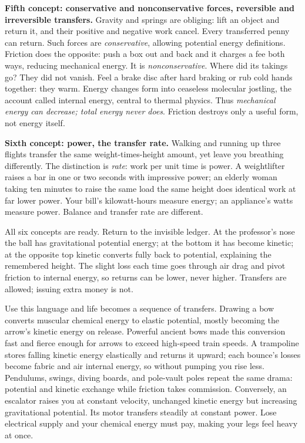 \begin{mainline}
\textbf{Fifth concept: conservative and nonconservative forces, reversible and irreversible transfers.} Gravity and springs are obliging: lift an object and return it, and their positive and negative work cancel. Every transferred penny can return. Such forces are \emph{conservative}, allowing potential energy definitions. Friction does the opposite: push a box out and back and it charges a fee both ways, reducing mechanical energy. It is \emph{nonconservative}. Where did its takings go? They did not vanish. Feel a brake disc after hard braking or rub cold hands together: they warm. Energy changes form into ceaseless molecular jostling, the account called internal energy, central to thermal physics. Thus \emph{mechanical energy can decrease; total energy never does}. Friction destroys only a useful form, not energy itself.

\textbf{Sixth concept: power, the transfer rate.} Walking and running up three flights transfer the same weight-times-height amount, yet leave you breathing differently. The distinction is \emph{rate}: work per unit time is power. A weightlifter raises a bar in one or two seconds with impressive power; an elderly woman taking ten minutes to raise the same load the same height does identical work at far lower power. Your bill's kilowatt-hours measure energy; an appliance's watts measure power. Balance and transfer rate are different.
\end{mainline}

All six concepts are ready. Return to the invisible ledger. At the professor's nose the ball has gravitational potential energy; at the bottom it has become kinetic; at the opposite top kinetic converts fully back to potential, explaining the remembered height. The slight loss each time goes through air drag and pivot friction to internal energy, so returns can be lower, never higher. Transfers are allowed; issuing extra money is not.

Use this language and life becomes a sequence of transfers. Drawing a bow converts muscular chemical energy to elastic potential, mostly becoming the arrow's kinetic energy on release. Powerful ancient bows made this conversion fast and fierce enough for arrows to exceed high-speed train speeds. A trampoline stores falling kinetic energy elastically and returns it upward; each bounce's losses become fabric and air internal energy, so without pumping you rise less. Pendulums, swings, diving boards, and pole-vault poles repeat the same drama: potential and kinetic exchange while friction takes commission. Conversely, an escalator raises you at constant velocity, unchanged kinetic energy but increasing gravitational potential. Its motor transfers steadily at constant power. Lose electrical supply and your chemical energy must pay, making your legs feel heavy at once.

